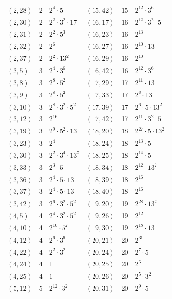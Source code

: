 \documentclass[11pt]{article}
\begin{document}
\begin{longtable}{@{}lrl@{\qquad}lrl@{}}
$(2,28)$ & 2 & $2^{4}\cdot 5$ & $(15,42)$ & 15 & $2^{12}\cdot 3^{6}$\\
$(2,30)$ & 2 & $2^{2}\cdot 3^{2}\cdot 17$ & $(16,17)$ & 16 & $2^{12}\cdot 3^{2}\cdot 5$\\
$(2,31)$ & 2 & $2^{2}\cdot 5^{3}$ & $(16,23)$ & 16 & $2^{13}$\\
$(2,32)$ & 2 & $2^{6}$ & $(16,27)$ & 16 & $2^{10}\cdot 13$\\
$(2,37)$ & 2 & $2^{2}\cdot 13^{2}$ & $(16,29)$ & 16 & $2^{10}$\\
$(3,5)$ & 3 & $2^{4}\cdot 3^{6}$ & $(16,42)$ & 16 & $2^{12}\cdot 3^{6}$\\
$(3,8)$ & 3 & $2^{8}\cdot 5^{2}$ & $(17,29)$ & 17 & $2^{11}\cdot 13$\\
$(3,9)$ & 3 & $2^{8}\cdot 5^{2}$ & $(17,33)$ & 17 & $2^{6}\cdot 13$\\
$(3,10)$ & 3 & $2^{8}\cdot 3^{2}\cdot 5^{2}$ & $(17,39)$ & 17 & $2^{6}\cdot 5\cdot 13^{2}$\\
$(3,12)$ & 3 & $2^{16}$ & $(17,42)$ & 17 & $2^{11}\cdot 3^{2}\cdot 5$\\
$(3,19)$ & 3 & $2^{9}\cdot 5^{2}\cdot 13$ & $(18,20)$ & 18 & $2^{27}\cdot 5\cdot 13^{2}$\\
$(3,23)$ & 3 & $2^{4}$ & $(18,24)$ & 18 & $2^{13}\cdot 5$\\
$(3,30)$ & 3 & $2^{2}\cdot 3^{4}\cdot 13^{2}$ & $(18,25)$ & 18 & $2^{14}\cdot 5$\\
$(3,33)$ & 3 & $2^{3}\cdot 5$ & $(18,34)$ & 18 & $2^{12}\cdot 13^{2}$\\
$(3,36)$ & 3 & $2^{4}\cdot 5\cdot 13$ & $(18,39)$ & 18 & $2^{16}$\\
$(3,37)$ & 3 & $2^{4}\cdot 5\cdot 13$ & $(18,40)$ & 18 & $2^{16}$\\
$(3,42)$ & 3 & $2^{6}\cdot 3^{2}\cdot 5^{2}$ & $(19,20)$ & 19 & $2^{28}\cdot 13^{2}$\\
$(4,5)$ & 4 & $2^{4}\cdot 3^{2}\cdot 5^{2}$ & $(19,26)$ & 19 & $2^{12}$\\
$(4,10)$ & 4 & $2^{10}\cdot 5^{2}$ & $(19,30)$ & 19 & $2^{18}\cdot 13$\\
$(4,12)$ & 4 & $2^{6}\cdot 3^{6}$ & $(20,21)$ & 20 & $2^{31}$\\
$(4,22)$ & 4 & $2^{2}\cdot 3^{2}$ & $(20,24)$ & 20 & $2^{7}\cdot 5$\\
$(4,24)$ & 4 & $1$ & $(20,25)$ & 20 & $2^{6}$\\
$(4,25)$ & 4 & $1$ & $(20,26)$ & 20 & $2^{5}\cdot 3^{2}$\\
$(5,12)$ & 5 & $2^{12}\cdot 3^{2}$ & $(20,31)$ & 20 & $2^{9}\cdot 5$\\

\end{longtable}
\end{document}
